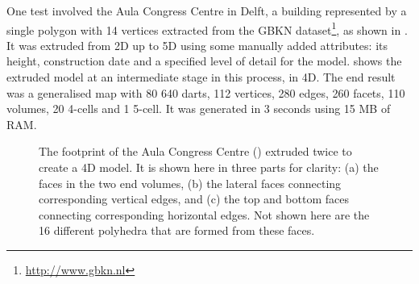 One test involved the Aula Congress Centre in Delft, a building represented by a single polygon with 14 vertices extracted from the GBKN dataset\footnote{\url{http://www.gbkn.nl}}, as shown in .
It was extruded from 2D up to 5D using some manually added attributes: its height, construction date and a specified level of detail for the model.
 shows the extruded model at an intermediate stage in this process, in 4D.
The end result was a generalised map with 80 640 darts, 112 vertices, 280 edges, 260 facets, 110 volumes, 20 4-cells and 1 5-cell.
It was generated in 3 seconds using 15 MB of RAM.\@
\begin{figure}[b]
\centering
{}
{}
{}
\caption[Extruding the footprint of the Aula Congress Centre in Delft to 4D]{The footprint of the Aula Congress Centre () extruded twice to create a 4D model.
It is shown here in three parts for clarity: (a) the faces in the two end volumes, (b) the lateral faces connecting corresponding vertical edges, and (c) the top and bottom faces connecting corresponding horizontal edges.
Not shown here are the 16 different polyhedra that are formed from these faces.}
\label{fig:aula4d}
\end{figure}

